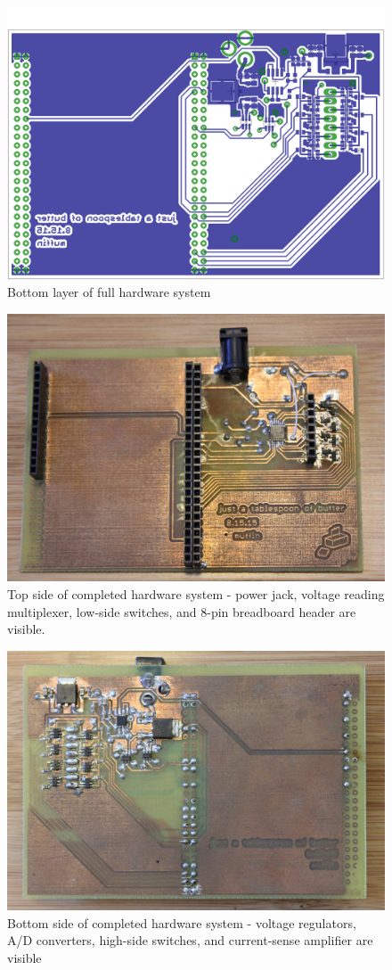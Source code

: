 \documentclass[11pt,twoside]{mitthesis}
\begin{document}
\begin{figure}[h]
  \begin{center}
      \includegraphics[width=.55\textwidth]{../layout-b.png}
      \caption{Bottom layer of full hardware system}
  \end{center}
\end{figure}

\begin{figure}[h]
  \begin{center}
      \includegraphics[width=.55\textwidth]{../butter-top.png}
      \caption{Top side of completed hardware system - power jack, voltage reading multiplexer, low-side switches, and 8-pin breadboard header are visible.}
  \end{center}
\end{figure}

\begin{figure}[h]
  \begin{center}
      \includegraphics[width=.55\textwidth]{../butter-bot.png}
      \caption{Bottom side of completed hardware system - voltage regulators, A/D converters, high-side switches, and current-sense amplifier are visible}
  \end{center}
\end{figure}
\end{document}

